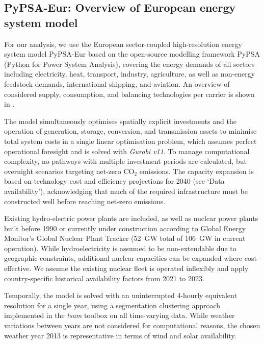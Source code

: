 

\subsection*{PyPSA-Eur: Overview of European energy system model}

For our analysis, we use the European sector-coupled high-resolution energy
system model PyPSA-Eur\cite{horschPyPSAEurOpen2018a} based on the open-source
modelling framework PyPSA\cite{brownPyPSAPython2018} (Python for Power System
Analysis), covering the energy demands of all sectors including electricity,
heat, transport, industry, agriculture, as well as non-energy feedstock demands,
international shipping, and aviation. An overview of considered supply,
consumption, and balancing technologies per carrier is shown in
.

The model simultaneously optimises spatially explicit investments and the
operation of generation, storage, conversion, and transmission assets to
minimise total system costs in a single linear optimisation problem, which
assumes perfect operational foresight and is solved with \textit{Gurobi
v11}.\cite{gurobi} To manage computational complexity, no pathways with multiple
investment periods are calculated, but overnight scenarios targeting net-zero
CO$_2$ emissions. The capacity expansion is based on technology cost and
efficiency projections for 2040 (see `Data availability'), acknowledging that
much of the required infrastructure must be constructed well before reaching
net-zero emissions.

Existing hydro-electric power plants\cite{gotzensPerformingEnergy2019} are
included, as well as nuclear power plants built before 1990 or currently under
construction according to Global Energy Monitor's Global Nuclear Plant Tracker
(52~GW total of 106~GW in current
operation).\cite{globalenergymonitorGlobalNuclearPower2024} While
hydroelectricity is assumed to be non-extendable due to geographic constraints,
additional nuclear capacities can be expanded where cost-effective. We assume
the existing nuclear fleet is operated inflexibly and apply country-specific
historical availability factors from 2021 to
2023.\cite{internationalatomicenergyagencyPowerReactorInformation2024}

Temporally, the model is solved with an uninterrupted 4-hourly equivalent
resolution for a single year, using a segmentation clustering approach
implemented in the \textit{tsam} toolbox on all time-varying
data.\cite{hoffmannParetooptimalTemporal2022} While weather variations between
years are not considered for computational reasons, the chosen weather year 2013
is representative in terms of wind and solar
availability.\cite{gotskeDesigningSectorcoupledEuropean2024}

